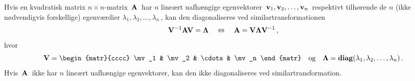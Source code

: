 \begin{theorem} \label{saet.diag}
Hvis en kvadratisk matrix $n\times n$-matrix $\,\mathbf{A}\,$ har $ n $ lineært uafhængige egenvektorer $\, \mathbf{v}_1, \mathbf{v}_2, \ldots, \mathbf{v}_n \,$ respektivt tilhørende de $n$ (ikke nødvendigvis forskellige) egenværdier $\lambda_1, \lambda_2, \ldots, \lambda_n\,$, kan den diagonaliseres ved similartransformationen 
\begin{equation}
\mathbf{V}^{-1} \mathbf{A} \mathbf{V} = \bm{\Lambda} \quad \Leftrightarrow \quad \mathbf{A} = \mathbf{V} \bm{\Lambda} \mathbf{V}^{-1} \, ,
\end{equation}
hvor
\begin{equation}
\mV = \begin{matr}{cccc} \mv_1 & \mv_2 & \cdots & \mv_n \end{matr} \quad \mathrm{og} \quad \mL = \diag(\lambda_1, \lambda_2, \ldots, \lambda_n) \, .
\end{equation}
Hvis $\,\mathbf{A}\,$ ikke har $ n $ lineært uafhængige egenvektorer, kan den ikke diagonaliseres ved similartransformation.
\end{theorem}

